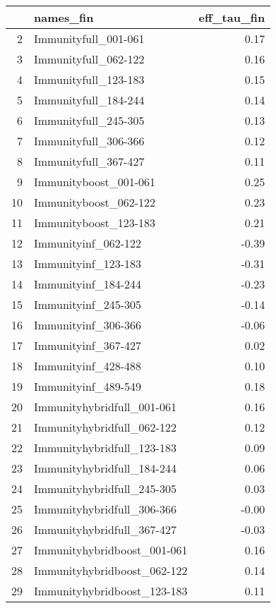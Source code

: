 \begin{table}[ht]
\centering
\begin{tabular}{rlr}
  \hline
 & names\_fin & eff\_tau\_fin \\ 
  \hline
2 & Immunityfull\_001-061 & 0.17 \\ 
  3 & Immunityfull\_062-122 & 0.16 \\ 
  4 & Immunityfull\_123-183 & 0.15 \\ 
  5 & Immunityfull\_184-244 & 0.14 \\ 
  6 & Immunityfull\_245-305 & 0.13 \\ 
  7 & Immunityfull\_306-366 & 0.12 \\ 
  8 & Immunityfull\_367-427 & 0.11 \\ 
  9 & Immunityboost\_001-061 & 0.25 \\ 
  10 & Immunityboost\_062-122 & 0.23 \\ 
  11 & Immunityboost\_123-183 & 0.21 \\ 
  12 & Immunityinf\_062-122 & -0.39 \\ 
  13 & Immunityinf\_123-183 & -0.31 \\ 
  14 & Immunityinf\_184-244 & -0.23 \\ 
  15 & Immunityinf\_245-305 & -0.14 \\ 
  16 & Immunityinf\_306-366 & -0.06 \\ 
  17 & Immunityinf\_367-427 & 0.02 \\ 
  18 & Immunityinf\_428-488 & 0.10 \\ 
  19 & Immunityinf\_489-549 & 0.18 \\ 
  20 & Immunityhybridfull\_001-061 & 0.16 \\ 
  21 & Immunityhybridfull\_062-122 & 0.12 \\ 
  22 & Immunityhybridfull\_123-183 & 0.09 \\ 
  23 & Immunityhybridfull\_184-244 & 0.06 \\ 
  24 & Immunityhybridfull\_245-305 & 0.03 \\ 
  25 & Immunityhybridfull\_306-366 & -0.00 \\ 
  26 & Immunityhybridfull\_367-427 & -0.03 \\ 
  27 & Immunityhybridboost\_001-061 & 0.16 \\ 
  28 & Immunityhybridboost\_062-122 & 0.14 \\ 
  29 & Immunityhybridboost\_123-183 & 0.11 \\ 
   \hline
\end{tabular}
\end{table}
